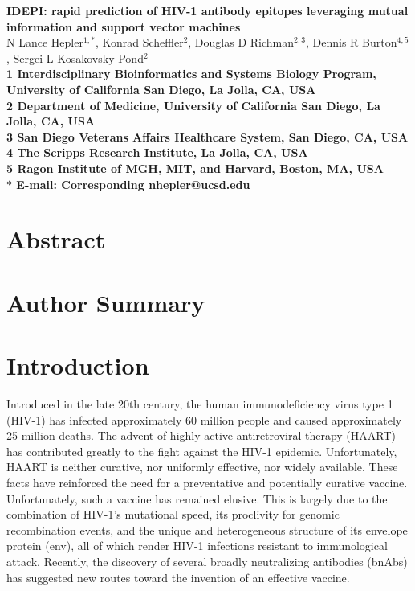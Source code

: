 \documentclass[10pt]{article}
\date{}
\newcommand{\idepi}{{IDEPI}}
\newcommand{\hiv}{{HIV}-1}
\begin{document}
\begin{flushleft}
{\Large
\textbf{\idepi{}: rapid prediction of \hiv{} antibody epitopes leveraging mutual information and support vector machines}
}
\\
N Lance Hepler$^{1,\ast}$,
Konrad Scheffler$^{2}$,
Douglas D Richman$^{2,3}$,
Dennis R Burton$^{4,5}$,
Sergei L Kosakovsky Pond$^{2}$
\\
\bf{1} Interdisciplinary Bioinformatics and Systems Biology Program, University of California San Diego, La Jolla, CA, USA
\\
\bf{2} Department of Medicine, University of California San Diego, La Jolla, CA, USA
\\
\bf{3} San Diego Veterans Affairs Healthcare System, San Diego, CA, USA
\\
\bf{4} The Scripps Research Institute, La Jolla, CA, USA
\\
\bf{5} Ragon Institute of {MGH}, {MIT}, and Harvard, Boston, MA, USA
\\
$\ast$ E-mail: Corresponding nhepler@ucsd.edu
\end{flushleft}

\section*{Abstract}

\section*{Author Summary}

\section*{Introduction}
Introduced in the late 20th century,
the human immunodeficiency virus type 1 (\hiv{}) has infected approximately 60 million people
and caused approximately 25 million deaths.
The advent of highly active antiretroviral therapy ({HAART}) has contributed greatly to the fight against the \hiv{} epidemic.
Unfortunately, HAART is neither curative, nor uniformly effective, nor widely available.
These facts have reinforced the need for a preventative and potentially curative vaccine.
Unfortunately, such a vaccine has remained elusive.
This is largely due to the combination of \hiv{}'s mutational speed,
its proclivity for genomic recombination events,
and the unique and heterogeneous structure of its envelope protein (env),
all of which render \hiv{} infections resistant to immunological attack.
Recently, the discovery of several broadly neutralizing antibodies (bnAbs) has suggested new routes toward the invention of an effective vaccine.
\end{document}
